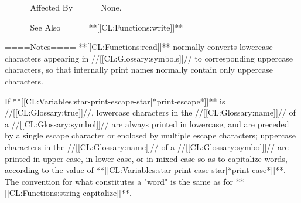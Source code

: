 ====Affected By====
None.

====See Also====
**[[CL:Functions:write]]**

====Notes====
**[[CL:Functions:read]]** normally converts lowercase characters appearing in //[[CL:Glossary:symbols]]// to corresponding uppercase characters, so that internally print names normally contain only uppercase characters.

If **[[CL:Variables:star-print-escape-star|*print-escape*]]** is //[[CL:Glossary:true]]//, lowercase characters in the //[[CL:Glossary:name]]// of a //[[CL:Glossary:symbol]]// are always printed in lowercase, and are preceded by a single escape character or enclosed by multiple escape characters; uppercase characters in the //[[CL:Glossary:name]]// of a //[[CL:Glossary:symbol]]// are printed in upper case, in lower case, or in mixed case so as to capitalize words, according to the value of **[[CL:Variables:star-print-case-star|*print-case*]]**. The convention for what constitutes a "word" is the same as for **[[CL:Functions:string-capitalize]]**.

  
